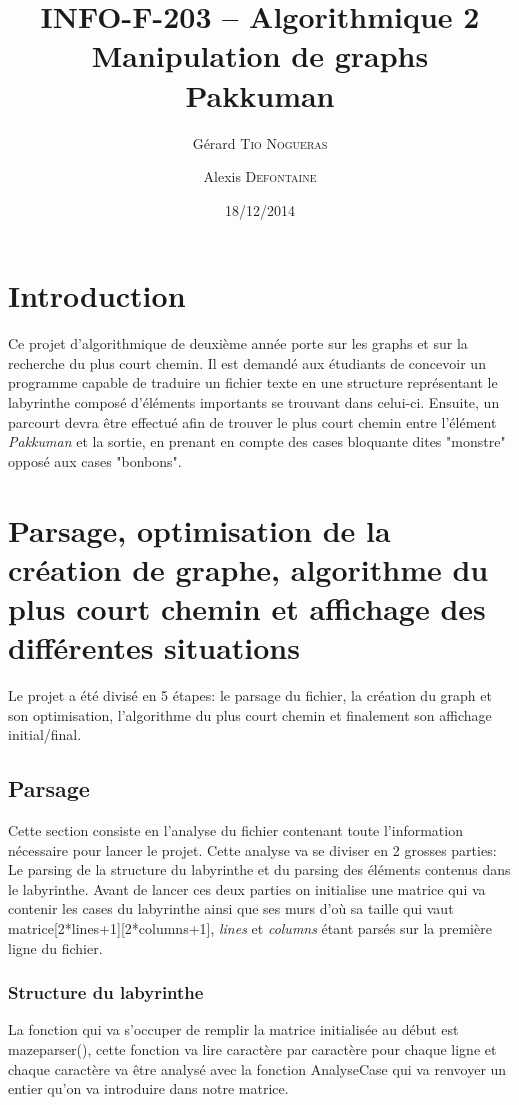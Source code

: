 \documentclass[12pt, oneside]{article}
\title{{\normalsize{INFO-F-203 -- Algorithmique 2}}\\Manipulation de graphs\\ Pakkuman}
\author{Gérard \textsc{Tio Nogueras} \and Alexis \textsc{Defontaine}}
\date{18/12/2014}
\begin{document}
\maketitle

\section{Introduction}
Ce projet d'algorithmique de deuxième année porte sur les graphs et sur la recherche du plus court chemin.
Il est demandé aux étudiants de concevoir un programme capable de traduire un fichier texte en une structure représentant le labyrinthe composé d'éléments importants se trouvant dans celui-ci. 
Ensuite, un parcourt devra être effectué afin de trouver le plus court chemin entre l'élément \emph{Pakkuman} et la sortie, en prenant en compte des cases bloquante dites "monstre" opposé aux cases "bonbons".
\section{Parsage, optimisation de la création de graphe, algorithme du plus court chemin et affichage des différentes situations}
Le projet a été divisé en 5 étapes: le parsage du fichier, la création du graph et son optimisation, l'algorithme du plus court chemin et finalement son affichage initial/final.
\subsection{Parsage}
Cette section consiste en l'analyse du fichier contenant toute l'information nécessaire pour lancer le projet. Cette analyse va se diviser en 2 grosses parties: Le parsing de la structure du labyrinthe et du parsing des éléments contenus dans le labyrinthe. Avant de lancer ces deux parties on initialise une matrice qui va contenir les cases du labyrinthe  ainsi que ses murs d'où sa taille qui vaut matrice[2*lines+1][2*columns+1], \emph{lines} et \emph{columns} étant parsés sur la première ligne du fichier. 
 
\subsubsection{Structure du labyrinthe}
La fonction qui va s'occuper de remplir la matrice initialisée au début est maze\textunderscore parser(), cette fonction va lire caractère par caractère pour chaque ligne et chaque caractère va être analysé avec la fonction Analyse\textunderscore Case qui va renvoyer un entier qu'on va introduire dans notre matrice.
\end{document}
